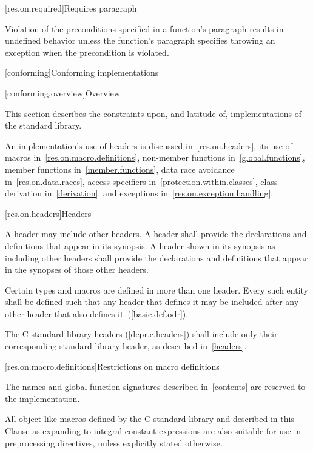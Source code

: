 [res.on.required]{Requires paragraph}

\pnum
{}%
Violation of the preconditions specified in a function's
\requires
paragraph results in undefined behavior unless the function's
\throws
paragraph specifies throwing an exception when the precondition is violated.

[conforming]{Conforming implementations}

[conforming.overview]{Overview}

\pnum
This section describes the constraints upon, and latitude of, implementations of the \Cpp standard library.

\pnum
An implementation's use of headers is discussed in~\ref{res.on.headers}, its use
of macros in~\ref{res.on.macro.definitions}, non-member functions
in~\ref{global.functions}, member functions in~\ref{member.functions}, data race
avoidance in~\ref{res.on.data.races}, access specifiers
in~\ref{protection.within.classes}, class derivation in~\ref{derivation}, and
exceptions in~\ref{res.on.exception.handling}.

[res.on.headers]{Headers}

\pnum
A \Cpp header may include other \Cpp headers.
A \Cpp header shall provide the declarations and definitions that appear in its
synopsis. A \Cpp header shown in its synopsis as including other \Cpp headers
shall provide the declarations and definitions that appear in the synopses of
those other headers.

\pnum
Certain types and macros are defined in more than one header.
Every such entity shall be defined such that any header that defines it may be
included after any other header that also defines it~(\ref{basic.def.odr}).

\pnum
The C standard library headers (\ref{depr.c.headers})
shall include only their corresponding \Cpp standard library header,
as described in~\ref{headers}.

[res.on.macro.definitions]{Restrictions on macro definitions}
%

\pnum
The names and global function signatures described in~\ref{contents} are
reserved to the implementation.
%
%
%
%
%

\pnum
All object-like macros defined by the C standard library and described in this
Clause as expanding to integral constant expressions are also suitable for use
in  preprocessing directives, unless
explicitly stated otherwise.

